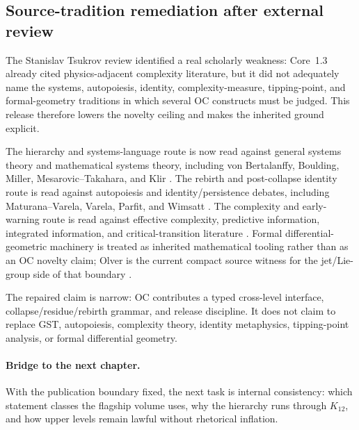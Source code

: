 \subsection{Source-tradition remediation after external review}
\label{sec:oc13-source-tradition-remediation-v3}

The Stanislav Tsukrov review identified a real scholarly weakness: Core~1.3
already cited physics-adjacent complexity literature, but it did not adequately
name the systems, autopoiesis, identity, complexity-measure, tipping-point, and
formal-geometry traditions in which several OC constructs must be judged. This
release therefore lowers the novelty ceiling and makes the inherited ground
explicit.

The hierarchy and systems-language route is now read against general systems
theory and mathematical systems theory, including von Bertalanffy,
Boulding, Miller, Mesarovic--Takahara, and Klir
\cite{bertalanffy_general_system_theory,boulding_general_systems_theory,miller_living_systems,mesarovic_takahara_general_systems,klir_architecture_systems}.
The rebirth and post-collapse identity route is read against autopoiesis and
identity/persistence debates, including Maturana--Varela, Varela, Parfit, and
Wimsatt \cite{maturana_varela_autopoiesis,varela_biological_autonomy,parfit_reasons_persons,wimsatt_reductionism_levels}.
The complexity and early-warning route is read against effective complexity,
predictive information, integrated information, and critical-transition
literature \cite{gell_mann_effective_complexity,bialek_predictability_complexity,tononi_information_integration,scheffer_critical_transitions,dakos_early_warning}.
Formal differential-geometric machinery is treated as inherited mathematical
tooling rather than as an OC novelty claim; Olver is the current compact source
witness for the jet/Lie-group side of that boundary \cite{olver_lie_groups}.

The repaired claim is narrow: OC contributes a typed cross-level interface,
collapse/residue/rebirth grammar, and release discipline. It does not claim to
replace GST, autopoiesis, complexity theory, identity metaphysics, tipping-point
analysis, or formal differential geometry.

\paragraph{Bridge to the next chapter.}
With the publication boundary fixed, the next task is internal consistency:
which statement classes the flagship volume uses, why the hierarchy runs
through \(K_{12}\), and how upper levels remain lawful without rhetorical
inflation.

\clearpage

